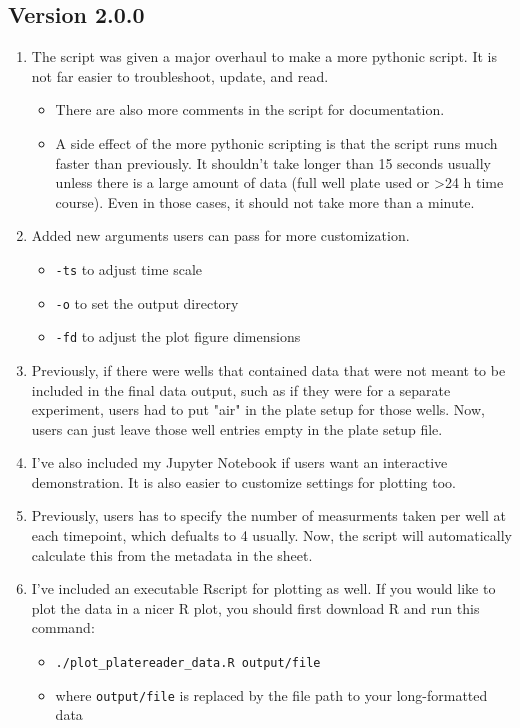 \documentclass[12pt]{article}
\begin{document}
\subsection*{Version 2.0.0}
\label{sec:org5ec56d2}
\begin{enumerate}
\item The script was given a major overhaul to make a more pythonic script. It is not far easier to troubleshoot, update, and read.
\begin{itemize}
\item There are also more comments in the script for documentation.
\item A side effect of the more pythonic scripting is that the script runs much faster than previously. It shouldn't take longer than 15 seconds usually unless there is a large amount of data (full well plate used or >24 h time course). Even in those cases, it should not take more than a minute.
\end{itemize}
\item Added new arguments users can pass for more customization.
\begin{itemize}
\item \texttt{-ts} to adjust time scale
\item \texttt{-o} to set the output directory
\item \texttt{-fd} to adjust the plot figure dimensions
\end{itemize}
\item Previously, if there were wells that contained data that were not meant to be included in the final data output, such as if they were for a separate experiment, users had to put "air" in the plate setup for those wells. Now, users can just leave those well entries empty in the plate setup file.
\item I've also included my Jupyter Notebook if users want an interactive demonstration. It is also easier to customize settings for plotting too.
\item Previously, users has to specify the number of measurments taken per well at each timepoint, which defualts to 4 usually. Now, the script will automatically calculate this from the metadata in the sheet.
\item I've included an executable Rscript for plotting as well. If you would like to plot the data in a nicer R plot, you should first download R and run this command:
\begin{itemize}
\item \texttt{./plot\_platereader\_data.R output/file}
\item where \texttt{output/file} is replaced by the file path to your long-formatted data
\end{itemize}
\end{enumerate}
\end{document}

